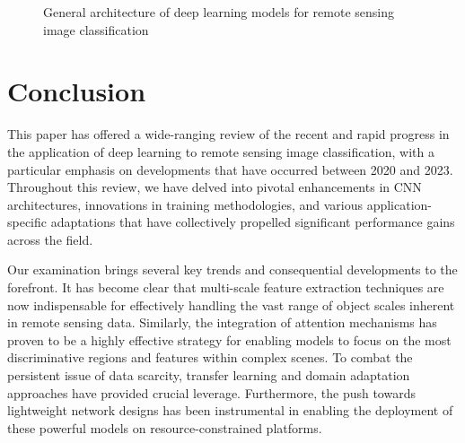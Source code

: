 \documentclass[12pt,a4paper]{article}
\begin{document}
\begin{figure}[htbp]
\centering
{}
\caption{General architecture of deep learning models for remote sensing image classification}
\label{fig:architecture}
\end{figure}

\section{Conclusion}
\label{sec:conclusion}

This paper has offered a wide-ranging review of the recent and rapid progress in the application of deep learning to remote sensing image classification, with a particular emphasis on developments that have occurred between 2020 and 2023. Throughout this review, we have delved into pivotal enhancements in CNN architectures, innovations in training methodologies, and various application-specific adaptations that have collectively propelled significant performance gains across the field.

Our examination brings several key trends and consequential developments to the forefront. It has become clear that multi-scale feature extraction techniques are now indispensable for effectively handling the vast range of object scales inherent in remote sensing data. Similarly, the integration of attention mechanisms has proven to be a highly effective strategy for enabling models to focus on the most discriminative regions and features within complex scenes. To combat the persistent issue of data scarcity, transfer learning and domain adaptation approaches have provided crucial leverage. Furthermore, the push towards lightweight network designs has been instrumental in enabling the deployment of these powerful models on resource-constrained platforms.
\end{document}
